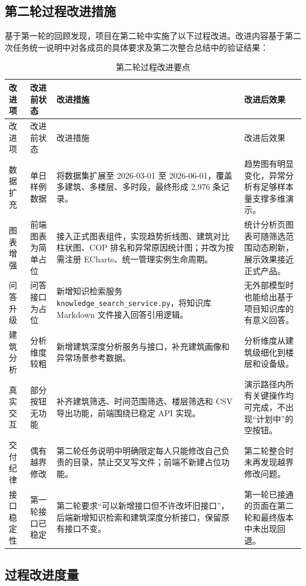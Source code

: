 \documentclass[12pt,a4paper]{ctexart}
\newcommand{\code}[1]{{\footnotesize\nolinkurl{#1}}}
\begin{document}
\subsection{第二轮过程改进措施}

基于第一轮的回顾发现，项目在第二轮中实施了以下过程改进。改进内容基于第二次任务统一说明中对各成员的具体要求及第二次整合总结中的验证结果：

\begin{longtable}{L{2.4cm}L{3.2cm}L{4.0cm}L{4.4cm}}
\caption{第二轮过程改进要点}\\
\toprule
改进项 & 改进前状态 & 改进措施 & 改进后效果 \\
\midrule
\endfirsthead
\toprule
改进项 & 改进前状态 & 改进措施 & 改进后效果 \\
\midrule
\endhead
数据扩充 & 单日样例数据 & 将数据集扩展至 2026-03-01 至 2026-06-01，覆盖多建筑、多楼层、多时段，最终形成 2,976 条记录。 & 趋势图有明显变化，异常分析有足够样本量支撑多维演示。 \\
图表增强 & 前端图表为简单占位 & 接入正式图表组件，实现趋势折线图、建筑对比柱状图、COP 排名和异常原因统计图；并改为按需注册 ECharts、统一管理实例生命周期。 & 统计分析页图表可随筛选范围动态刷新，展示效果接近正式产品。 \\
问答升级 & 问答接口为占位 & 新增知识检索服务 \code{knowledge\_search\_service.py}，将知识库 Markdown 文件接入回答引用逻辑。 & 无外部模型时也能给出基于项目知识库的有意义回答。 \\
建筑分析 & 分析维度较粗 & 新增建筑深度分析服务与接口，补充建筑画像和异常场景参考数据。 & 分析维度从建筑级细化到楼层和设备级。 \\
真实交互 & 部分按钮无功能 & 补齐建筑筛选、时间范围筛选、楼层筛选和 CSV 导出功能，前端围绕已稳定 API 实现。 & 演示路径内所有关键操作均可完成，不出现“计划中”的空按钮。 \\
交付纪律 & 偶有越界修改 & 第二轮任务说明中明确限定每人只能修改自己负责的目录，禁止交叉写文件；前端不新建占位功能。 & 第二轮整合时未再发现越界修改问题。 \\
接口稳定性 & 第一轮接口已稳定 & 第二轮要求“可以新增接口但不许改坏旧接口”，后端新增知识检索和建筑深度分析接口，保留原有接口不变。 & 第一轮已接通的页面在第二轮和最终版本中未出现回退。 \\
\bottomrule
\end{longtable}

\subsection{过程改进度量}
\end{document}
